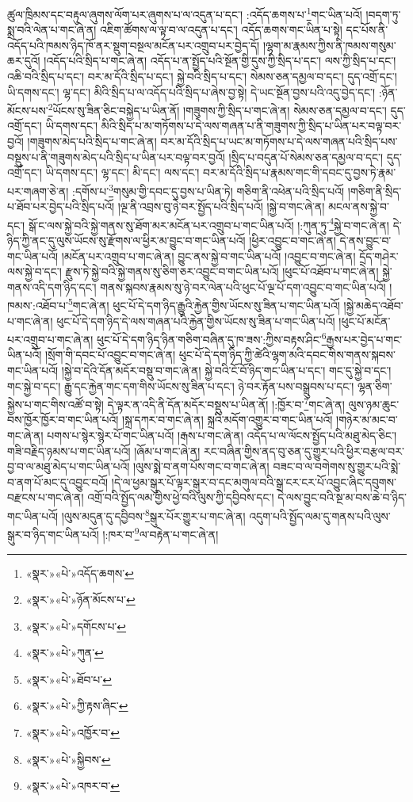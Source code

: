 ཚུལ་ཁྲིམས་དང་བརྟུལ་ཞུགས་ལོག་པར་ཞུགས་པ་ལ་འདུན་པ་དང་། :འདོད་ཆགས་པ་\footnote{«སྣར་»«པེ་»འདོད་ཆགས་}གང་ཡིན་པའོ། །བདག་ཏུ་སྨྲ་བའི་ལེན་པ་གང་ཞེ་ན། འཇིག་ཚོགས་ལ་ལྟ་བ་ལ་འདུན་པ་དང་། འདོད་ཆགས་གང་ཡིན་པ་སྟེ། དང་པོས་ནི་འདོད་པའི་ཁམས་ཉིད་ཁོ་ནར་སྡུག་བསྔལ་མངོན་པར་འགྲུབ་པར་བྱེད་དོ། །ལྷག་མ་རྣམས་ཀྱིས་ནི་ཁམས་གསུམ་ཆར་དུའོ། །འདོད་པའི་སྲིད་པ་གང་ཞེ་ན། འདོད་པ་ན་སྤྱོད་པའི་སྔོན་གྱི་དུས་ཀྱི་སྲིད་པ་དང་། ལས་ཀྱི་སྲིད་པ་དང་། འཆི་བའི་སྲིད་པ་དང་། བར་མ་དོའི་སྲིད་པ་དང་། སྐྱེ་བའི་སྲིད་པ་དང་། སེམས་ཅན་དམྱལ་བ་དང་། དུད་འགྲོ་དང་། ཡི་དགས་དང་། ལྷ་དང་། མིའི་སྲིད་པ་ལ་འདོད་པའི་སྲིད་པ་ཞེས་བྱ་སྟེ། དེ་ཡང་སྔོན་བྱས་པའི་འདུ་བྱེད་དང་། :ཉོན་མོངས་པས་\footnote{«སྣར་»«པེ་»ཉོན་མོངས་པ་}ཡོངས་སུ་ཟིན་ཅིང་བསྐྱེད་པ་ཡིན་ནོ། །གཟུགས་ཀྱི་སྲིད་པ་གང་ཞེ་ན། སེམས་ཅན་དམྱལ་བ་དང་། དུད་འགྲོ་དང་། ཡི་དགས་དང་། མིའི་སྲིད་པ་མ་གཏོགས་པ་དེ་ལས་གཞན་པ་ནི་གཟུགས་ཀྱི་སྲིད་པ་ཡིན་པར་བལྟ་བར་བྱའོ། །གཟུགས་མེད་པའི་སྲིད་པ་གང་ཞེ་ན། བར་མ་དོའི་སྲིད་པ་ཡང་མ་གཏོགས་པ་དེ་ལས་གཞན་པའི་སྲིད་པས་བསྡུས་པ་ནི་གཟུགས་མེད་པའི་སྲིད་པ་ཡིན་པར་བལྟ་བར་བྱའོ། །སྲིད་པ་བདུན་པོ་སེམས་ཅན་དམྱལ་བ་དང་། དུད་འགྲོ་དང་། ཡི་དགས་དང་། ལྷ་དང་། མི་དང་། ལས་དང་། བར་མ་དོའི་སྲིད་པ་རྣམས་གང་གི་དབང་དུ་བྱས་ཏེ་རྣམ་པར་གཞག་ཅེ་ན། :དགོས་པ་\footnote{«སྣར་»«པེ་»དགོངས་པ་}གསུམ་གྱི་དབང་དུ་བྱས་པ་ཡིན་ཏེ། གཅིག་ནི་འཕེན་པའི་སྲིད་པའོ། །གཅིག་ནི་སྲིད་པ་ཐོབ་པར་བྱེད་པའི་སྲིད་པའོ། །ལྔ་ནི་འབྲས་བུ་ཉེ་བར་སྤྱོད་པའི་སྲིད་པའོ། །སྐྱེ་བ་གང་ཞེ་ན། མངལ་ནས་སྐྱེ་བ་དང་། སྒོ་ང་ལས་སྐྱེ་བའི་སྐྱེ་གནས་སུ་ཐོག་མར་མངོན་པར་འགྲུབ་པ་གང་ཡིན་པའོ། །:ཀུན་ཏུ་\footnote{«སྣར་»«པེ་»ཀུན་}སྐྱེ་བ་གང་ཞེ་ན། དེ་ཉིད་ཀྱི་ནང་དུ་ལུས་ཡོངས་སུ་རྫོགས་ལ་ཕྱིར་མ་བྱུང་བ་གང་ཡིན་པའོ། །ཕྱིར་འབྱུང་བ་གང་ཞེ་ན། དེ་ནས་བྱུང་བ་གང་ཡིན་པའོ། །མངོན་པར་འགྲུབ་པ་གང་ཞེ་ན། བྱུང་ནས་སྐྱེ་བ་གང་ཡིན་པའོ། །འབྱུང་བ་གང་ཞེ་ན། དྲོད་གཤེར་ལས་སྐྱེ་བ་དང་། རྫུས་ཏེ་སྐྱེ་བའི་སྐྱེ་གནས་སུ་ཅིག་ཅར་འབྱུང་བ་གང་ཡིན་པའོ། །ཕུང་པོ་འཐོབ་པ་གང་ཞེ་ན། སྐྱེ་གནས་འདི་དག་ཉིད་དང་། གནས་སྐབས་རྣམས་སུ་ཉེ་བར་ལེན་པའི་ཕུང་པོ་ལྔ་པོ་དག་འབྱུང་བ་གང་ཡིན་པའོ། །ཁམས་:འཐོབ་པ་\footnote{«སྣར་»«པེ་»ཐོབ་པ་}གང་ཞེ་ན། ཕུང་པོ་དེ་དག་ཉིད་རྒྱུའི་རྐྱེན་གྱིས་ཡོངས་སུ་ཟིན་པ་གང་ཡིན་པའོ། །སྐྱེ་མཆེད་འཐོབ་པ་གང་ཞེ་ན། ཕུང་པོ་དེ་དག་ཉིད་དེ་ལས་གཞན་པའི་རྐྱེན་གྱིས་ཡོངས་སུ་ཟིན་པ་གང་ཡིན་པའོ། །ཕུང་པོ་མངོན་པར་འགྲུབ་པ་གང་ཞེ་ན། ཕུང་པོ་དེ་དག་ཉིད་ཉིན་གཅིག་བཞིན་དུ་ཁ་ཟས་:ཀྱིས་བརྟས་ཤིང་\footnote{«སྣར་»«པེ་»ཀྱི་རྟས་ཞིང་}རྒྱས་པར་བྱེད་པ་གང་ཡིན་པའོ། །སྲོག་གི་དབང་པོ་འབྱུང་བ་གང་ཞེ་ན། ཕུང་པོ་དེ་དག་ཉིད་ཀྱི་ཚེའི་ལྷག་མའི་དབང་གིས་གནས་སྐབས་གང་ཡིན་པའོ། །སྐྱེ་བ་དེའི་དོན་མདོར་བསྡུ་བ་གང་ཞེ་ན། སྐྱེ་བའི་ངོ་བོ་ཉིད་གང་ཡིན་པ་དང་། གང་དུ་སྐྱེ་བ་དང་། གང་སྐྱེ་བ་དང་། རྒྱུ་དང་རྐྱེན་གང་དག་གིས་ཡོངས་སུ་ཟིན་པ་དང་། ཉེ་བར་རྟོན་པས་བསྒྲུབས་པ་དང་། ལྷན་ཅིག་སྐྱེས་པ་གང་གིས་འཚོ་བ་སྟེ། དེ་ལྟར་ན་འདི་ནི་དོན་མདོར་བསྡུས་པ་ཡིན་ནོ། །:ཁྱོར་བ་\footnote{«སྣར་»«པེ་»འཁྱོར་བ་}གང་ཞེ་ན། ལུས་ཉམ་ཆུང་བས་ཁྱོར་ཁྱོར་བ་གང་ཡིན་པའོ། །སྐྲ་དཀར་བ་གང་ཞེ་ན། སྐྲའི་མདོག་འགྱུར་བ་གང་ཡིན་པའོ། །གཉེར་མ་མང་བ་གང་ཞེ་ན། པགས་པ་སྙེར་སྙེར་པོ་གང་ཡིན་པའོ། །རྒས་པ་གང་ཞེ་ན། འདོད་པ་ལ་ལོངས་སྤྱོད་པའི་མཐུ་མེད་ཅིང་། གཟི་བརྗིད་ཉམས་པ་གང་ཡིན་པའོ། །ཞོམ་པ་གང་ཞེ་ན། རང་བཞིན་གྱིས་ནད་བུ་ཅན་དུ་གྱུར་པའི་ཕྱིར་བརྩལ་བར་བྱ་བ་ལ་མཐུ་མེད་པ་གང་ཡིན་པའོ། །ལུས་སྨེ་བ་ནག་པོས་གང་བ་གང་ཞེ་ན། བཟང་བ་ལ་བགེགས་སུ་གྱུར་པའི་སྨེ་བ་ནག་པོ་མང་དུ་འབྱུང་བའོ། །དེ་ལ་ཕྱམ་སྒུར་པོ་ལྟར་སྒུར་བ་དང་མགུལ་བའི་སྒྲ་ངར་ངར་པོ་འབྱུང་ཞིང་དབུགས་བརྫངས་པ་གང་ཞེ་ན། འགྲོ་བའི་སྤྱོད་ལམ་གྱིས་ཕྱེ་བའི་ལུས་ཀྱི་དབྱིབས་དང་། དེ་ལས་བྱུང་བའི་སྔ་མ་བས་ཆེ་བ་ཉིད་གང་ཡིན་པའོ། །ལུས་མདུན་དུ་དབྱིབས་\footnote{«སྣར་»«པེ་»སྐྱིབས་}སྒུར་པོར་གྱུར་པ་གང་ཞེ་ན། འདུག་པའི་སྤྱོད་ལམ་དུ་གནས་པའི་ལུས་སྒུར་བ་ཉིད་གང་ཡིན་པའོ། །:ཁར་བ་\footnote{«སྣར་»«པེ་»འཁར་བ་}ལ་བརྟེན་པ་གང་ཞེ་ན། 